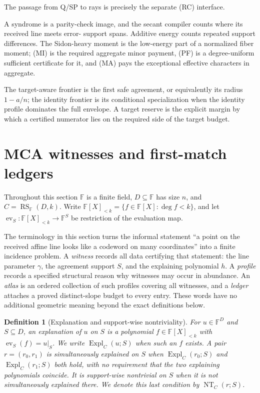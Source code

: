 \documentclass[12pt,a4paper]{amsart}
\numberwithin{equation}{section}
\newtheorem{definition}[definition]{Definition}
\theoremstyle{remark}
\DeclareMathOperator{\RS}{RS}
\newcommand{\F}{\mathbb F}
\begin{document}
\begin{description}[leftmargin=0pt,labelindent=0pt]
The passage from Q/SP to rays is precisely the separate \textup{(RC)}
interface.
\item[Syndrome, energy, and Fourier payment.] A syndrome is a parity-check
image, and the secant compiler counts where its received line meets error-
support spans.  Additive energy counts repeated support differences.  The
Sidon-heavy moment is the low-energy part of a normalized fiber moment;
\textup{(MI)} is the required aggregate minor payment, \textup{(PF)} is
a degree-uniform sufficient certificate for it, and \textup{(MA)} pays
the exceptional effective characters in aggregate.
\item[Frontier.] The target-aware frontier is the first safe agreement, or
equivalently its radius \(1-a/n\); the identity frontier is its conditional
specialization when the identity profile dominates the full envelope.  A
target reserve is the explicit margin by which a certified numerator lies
on the required side of the target budget.
\end{description}

\section{MCA witnesses and first-match ledgers}\label{sec:mca-ledger}

Throughout this section \(\F\) is a finite field, \(D\subseteq\F\) has
size \(n\), and \(C=\RS_\F(D,k)\).  Write
\(\F[X]_{<k}=\{f\in\F[X]:\deg f<k\}\), and let
\(\operatorname{ev}_S:\F[X]_{<k}\to\F^S\) be restriction of the
evaluation map.

The terminology in this section turns the informal statement ``a point on
the received affine line looks like a codeword on many coordinates'' into a
finite incidence problem.  A \emph{witness} records all data certifying that
statement: the line parameter \(\gamma\), the agreement support \(S\), and
the explaining polynomial \(h\).  A \emph{profile} records a specified
structural reason why witnesses may occur in abundance.  An \emph{atlas} is
an ordered collection of such profiles covering all witnesses, and a
\emph{ledger} attaches a proved distinct-slope budget to every entry.  These
words have no additional geometric meaning beyond the exact definitions
below.

\begin{definition}[Explanation and support-wise nontriviality]
\label{def:explanation}
For \(u\in\F^D\) and \(S\subseteq D\), an \emph{explanation of \(u\) on
\(S\)} is a polynomial \(f\in\F[X]_{<k}\) with
\(\operatorname{ev}_S(f)=u|_S\).  We write
\(\operatorname{Expl}_C(u;S)\) when such an \(f\) exists.  A pair
\(r=(r_0,r_1)\) is \emph{simultaneously explained on \(S\)} when
\(\operatorname{Expl}_C(r_0;S)\) and
\(\operatorname{Expl}_C(r_1;S)\) both hold, with no requirement that the
two explaining polynomials coincide.  It is \emph{support-wise
nontrivial on \(S\)} when it is not simultaneously explained there.
We denote this last condition by \(\operatorname{NT}_C(r;S)\).
\end{definition}
\end{document}
